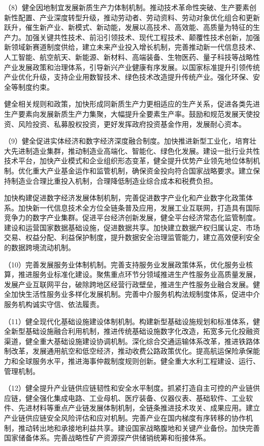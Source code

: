     （8）健全因地制宜发展新质生产力体制机制。推动技术革命性突破、生产要素创新性配置、产业深度转型升级，推动劳动者、劳动资料、劳动对象优化组合和更新跃升，催生新产业、新模式、新动能，发展以高技术、高效能、高质量为特征的生产力。加强关键共性技术、前沿引领技术、现代工程技术、颠覆性技术创新，加强新领域新赛道制度供给，建立未来产业投入增长机制，完善推动新一代信息技术、人工智能、航空航天、新能源、新材料、高端装备、生物医药、量子科技等战略性产业发展政策和治理体系，引导新兴产业健康有序发展。以国家标准提升引领传统产业优化升级，支持企业用数智技术、绿色技术改造提升传统产业。强化环保、安全等制度约束。

    健全相关规则和政策，加快形成同新质生产力更相适应的生产关系，促进各类先进生产要素向发展新质生产力集聚，大幅提升全要素生产率。鼓励和规范发展天使投资、风险投资、私募股权投资，更好发挥政府投资基金作用，发展耐心资本。

    （9）健全促进实体经济和数字经济深度融合制度。加快推进新型工业化，培育壮大先进制造业集群，推动制造业高端化、智能化、绿色化发展。建设一批行业共性技术平台，加快产业模式和企业组织形态变革，健全提升优势产业领先地位体制机制。优化重大产业基金运作和监管机制，确保资金投向符合国家战略要求。建立保持制造业合理比重投入机制，合理降低制造业综合成本和税费负担。

    加快构建促进数字经济发展体制机制，完善促进数字产业化和产业数字化政策体系。加快新一代信息技术全方位全链条普及应用，发展工业互联网，打造具有国际竞争力的数字产业集群。促进平台经济创新发展，健全平台经济常态化监管制度。建设和运营国家数据基础设施，促进数据共享。加快建立数据产权归属认定、市场交易、权益分配、利益保护制度，提升数据安全治理监管能力，建立高效便利安全的数据跨境流动机制。

    （10）完善发展服务业体制机制。完善支持服务业发展政策体系，优化服务业核算，推进服务业标准化建设。聚焦重点环节分领域推进生产性服务业高质量发展，发展产业互联网平台，破除跨地区经营行政壁垒，推进生产性服务业融合发展。健全加快生活性服务业多样化发展机制。完善中介服务机构法规制度体系，促进中介服务机构诚实守信、依法履责。

    （11）健全现代化基础设施建设体制机制。构建新型基础设施规划和标准体系，健全新型基础设施融合利用机制，推进传统基础设施数字化改造，拓宽多元化投融资渠道，健全重大基础设施建设协调机制。深化综合交通运输体系改革，推进铁路体制改革，发展通用航空和低空经济，推动收费公路政策优化。提高航运保险承保能力和全球服务水平，推进海事仲裁制度规则创新。健全重大水利工程建设、运行、管理机制。

    （12）健全提升产业链供应链韧性和安全水平制度。抓紧打造自主可控的产业链供应链，健全强化集成电路、工业母机、医疗装备、仪器仪表、基础软件、工业软件、先进材料等重点产业链发展体制机制，全链条推进技术攻关、成果应用。建立产业链供应链安全风险评估和应对机制。完善产业在国内梯度有序转移的协作机制，推动转出地和承接地利益共享。建设国家战略腹地和关键产业备份。加快完善国家储备体系。完善战略性矿产资源探产供储销统筹和衔接体系。


